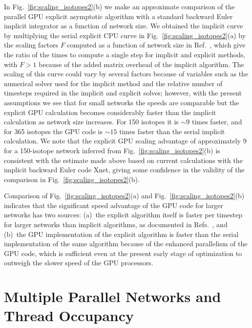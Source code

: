 \documentclass[]{elsart}
\newcommand{\fig}[1]{Fig.~\ref{fig:#1}}
\begin{document}
In \fig{scaling_isotopes2}(b) we make an approximate comparison of the parallel 
GPU explicit asymptotic algorithm with a standard backward Euler implicit 
integrator as a function of network size. We obtained the implicit curve by 
multiplying the serial explicit CPU curve in \fig{scaling_isotopes2}(a) by the 
scaling factors $F$  computed as a function of network size in Ref.\ 
\cite{guidAsy}, which give the ratio of the times to compute a single step for 
implicit and explicit methods, with $F > 1$ because of the added matrix 
overhead of the implicit algorithm.  The scaling of this curve could vary by 
several factors because of variables such as the numerical solver used for 
the implicit method and the relative number of timesteps required in the 
implicit and explicit solves; however, with the present assumptions we see that 
for small networks the speeds are comparable but the explicit GPU calculation 
becomes considerably faster than the implicit calculation as network size 
increases.  For 150 isotopes it is $\sim 9$ times faster, and for 365 isotopes 
the GPU code is $\sim 15$ times faster than the serial implicit calculation. We 
note that the explicit GPU scaling advantage of approximately 9 for a 
150-isotope network inferred from \fig{scaling_isotopes2}(b) is consistent with 
the estimate made above based on current calculations with the implicit backward 
Euler code Xnet, giving some confidence in the validity of the comparison in 
\fig{scaling_isotopes2}(b).  

Comparison of \fig{scaling_isotopes2}(a) and 
\fig{scaling_isotopes2}(b) indicates that the significant speed advantage of 
the GPU code for larger networks has two sources:  (a)~the explicit algorithm 
itself is faster per timestep for larger networks than implicit algorithms, as 
documented in Refs.\ \cite{guidAsy,guidQSS,guidPE,guidJCP}, and (b)~the GPU 
implementation of the explicit algorithm is faster than the serial 
implementation of the same algorithm because of the enhanced parallelism of the 
GPU code, which is sufficient even at the present early stage of optimization 
to outweigh the slower speed of the GPU processors.



\section{Multiple Parallel Networks and Thread Occupancy}
\end{document}
